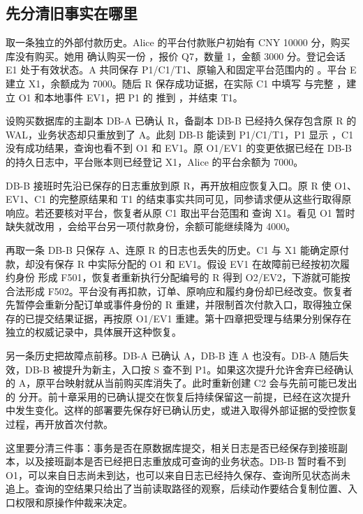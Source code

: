 \subsection*{先分清旧事实在哪里}

取一条独立的外部付款历史。Alice 的平台付款账户初始有 CNY 10000 分，购买库没有购买。她用  确认购买一份 ，报价 Q7，数量 1，金额 3000 分。登记会话 E1 处于有效状态。A 共同保存 P1/C1/T1、原输入和固定平台范围内的 。平台 E 建立 X1，余额成为 7000。随后 R 保存成功证据，在实际 C1 中填写  与完整 ，建立 O1 和本地事件 EV1，把 P1 的  推到 ，并结束 T1。

设购买数据库的主副本 DB-A 已确认 R，备副本 DB-B 已经持久保存包含原 R 的 WAL，业务状态却只重放到了 A。此刻 DB-B 能读到 P1/C1/T1，P1 显示 ，C1 没有成功结果，查询也看不到 O1 和 EV1。原 O1/EV1 的变更依据已经在 DB-B 的持久日志中，平台账本则已经登记 X1，Alice 的平台余额为 7000。

DB-B 接班时先沿已保存的日志重放到原 R，再开放相应恢复入口。原 R 使 O1、EV1、C1 的完整原结果和 T1 的结束事实共同可见，同参请求便从这些行取得原响应。若还要核对平台，恢复者从原 C1 取出平台范围和  查询 X1。看见 O1 暂时缺失就改用 ，会给平台另一项付款身份，余额可能继续降为 4000。

再取一条 DB-B 只保存 A、连原 R 的日志也丢失的历史。C1 与 X1 能确定原付款，却没有保存 R 中实际分配的 O1 和 EV1。假设 EV1 在故障前已经按初次履约身份  形成 F501，恢复者重新执行分配编号的 R 得到 O2/EV2，下游就可能按  合法形成 F502。平台没有再扣款，订单、原响应和履约身份却已经改变。恢复者先暂停会重新分配订单或事件身份的 R 重建，并限制首次付款入口，取得独立保存的已提交结果证据，再按原 O1/EV1 重建。第十四章把受理与结果分别保存在独立的权威记录中，具体展开这种恢复。

另一条历史把故障点前移。DB-A 已确认 A，DB-B 连 A 也没有。DB-A 随后失效，DB-B 被提升为新主，入口按 S 查不到 P1。如果这次提升允许舍弃已经确认的 A，原平台映射就从当前购买库消失了。此时重新创建 C2 会与先前可能已发出的  分开。前十章采用的已确认提交在恢复后持续保留这一前提，已经在这次提升中发生变化。这样的部署要先保存好已确认历史，或进入取得外部证据的受控恢复过程，再开放首次付款。


这里要分清三件事：事务是否在原数据库提交，相关日志是否已经保存到接班副本，以及接班副本是否已经把日志重放成可查询的业务状态。DB-B 暂时看不到 O1，可以来自日志尚未到达，也可以来自日志已经持久保存、查询所见状态尚未追上。查询的空结果只给出了当前读取路径的观察，后续动作要结合复制位置、入口权限和原操作仲裁来决定。

